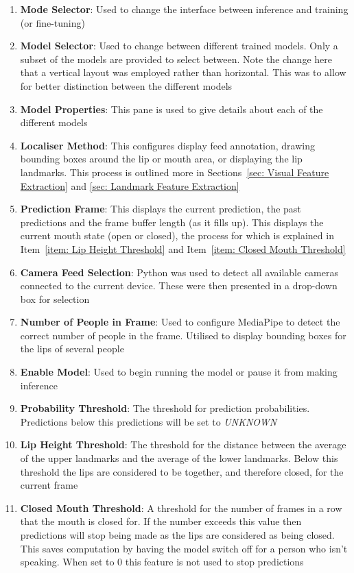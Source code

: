 \begin{enumerate}
    \item \textbf{Mode Selector}: Used to change the interface between inference and training (or \gls{fine-tuning})
    \item \textbf{Model Selector}: Used to change between different trained models. Only a subset of the models are provided to select between. Note the change here that a vertical layout was employed rather than horizontal. This was to allow for better distinction between the different models
    \item \textbf{Model Properties}: This pane is used to give details about each of the different models
    \item \textbf{Localiser Method}: This configures display feed annotation, drawing bounding boxes around the lip or mouth area, or displaying the lip landmarks. This process is outlined more in Sections~\ref{sec: Visual Feature Extraction} and \ref{sec: Landmark Feature Extraction}
    \item \textbf{Prediction Frame}: This displays the current prediction, the past predictions and the frame buffer length (as it fills up). This displays the current mouth state (open or closed), the process for which is explained in Item~\ref{item: Lip Height Threshold} and Item~\ref{item: Closed Mouth Threshold}
    \item \textbf{Camera Feed Selection}: Python was used to detect all available cameras connected to the current device. These were then presented in a drop-down box for selection 
    \item \textbf{Number of People in Frame}: Used to configure MediaPipe to detect the correct number of people in the frame. Utilised to display bounding boxes for the lips of several people
    \item \textbf{Enable Model}: Used to begin running the model or pause it from making inference
    \item \textbf{Probability Threshold}: The threshold for prediction probabilities. Predictions below this predictions will be set to \textit{UNKNOWN}
    \item \textbf{Lip Height Threshold}: The threshold for the distance between the average of the upper landmarks and the average of the lower landmarks. Below this threshold the lips are considered to be together, and therefore closed, for the current frame \label{item: Lip Height Threshold}
    \item \textbf{Closed Mouth Threshold}: A threshold for the number of frames in a row that the mouth is closed for. If the number exceeds this value then predictions will stop being made as the lips are considered as being closed. This saves computation by having the model switch off for a person who isn't speaking. When set to 0 this feature is not used to stop predictions \label{item: Closed Mouth Threshold}

\end{enumerate}
